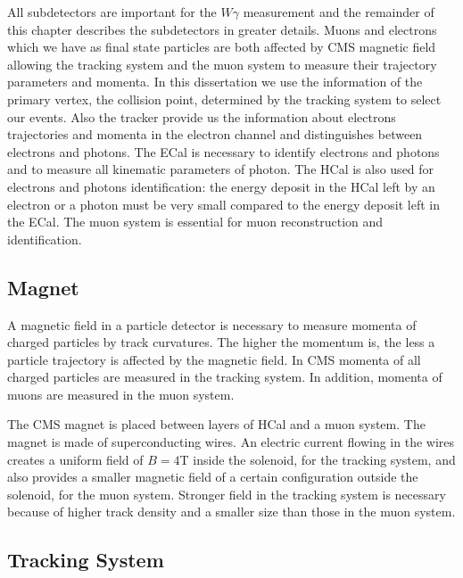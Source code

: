 All subdetectors are important for the $W\gamma$ measurement and the remainder of this chapter describes the subdetectors in greater details. Muons and electrons which we have as final state particles are both affected by CMS magnetic field allowing the tracking system and the muon system to measure their trajectory parameters and momenta. In this dissertation we use the information of the primary vertex, the collision point, determined by the tracking system to select our events. Also the tracker provide us the information about electrons trajectories and momenta in the electron channel and distinguishes between electrons and photons. The ECal is necessary to identify electrons and photons and to measure all kinematic parameters of photon. The HCal is also used for electrons and photons identification: the energy deposit in the HCal left by an electron or a photon must be very small compared to the energy deposit left in the ECal. The muon system is essential for muon reconstruction and identification.

\subsection{Magnet}

A magnetic field in a particle detector is necessary to measure momenta of charged particles by track curvatures. The higher the momentum is, the less a particle trajectory is affected by the magnetic field. In CMS momenta of all charged particles are measured in the tracking system. In addition, momenta of muons are measured in the muon system. 

The CMS magnet is placed between layers of HCal and a muon system. The magnet is made of superconducting wires. An electric current flowing in the wires creates a uniform field of $B=4$T inside the solenoid, for the tracking system, and also provides a smaller magnetic field of a certain configuration outside the solenoid, for the muon system. Stronger field in the tracking system is necessary because of higher track density and a smaller size than those in the muon system.

\subsection{Tracking System}

